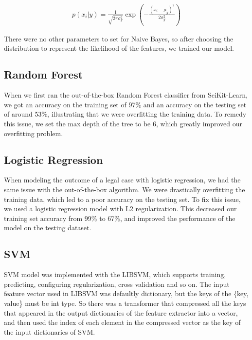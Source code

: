 \documentclass[journal]{IEEEtran}
\begin{document}
\begin{equation}
\begin{aligned}
p(x_i | y) = \frac{1}{\sqrt{2 \pi \sigma_y^2}} \exp \left ( - \frac{(x_i - \mu_y)^2}{2\sigma_y^2}\right)
\end{aligned}
\end{equation}

There were no other parameters to set for Naive Bayes, so after choosing the distribution to represent the likelihood of the features, we trained our model.

\subsection{Random Forest}

When we first ran the out-of-the-box Random Forest classifier from SciKit-Learn, we got an accuracy on the training set of 97\% and an accuracy on the testing set of around 53\%, illustrating that we were overfitting the training data. To remedy this issue, we set the max depth of the tree to be 6, which greatly improved our overfitting problem. 

\subsection{Logistic Regression}

When modeling the outcome of a legal case with logistic regression, we had the same issue with the out-of-the-box algorithm. We were drastically overfitting the training data, which led to a poor accuracy on the testing set. To fix this issue, we used a logistic regression model with L2 regularization. This decreased our training set accuracy from 99\% to 67\%, and improved the performance of the model on the testing dataset. 

\subsection{SVM}

SVM model was implemented with the LIBSVM, which supports training, predicting, configuring regularization, cross validation and so on. The input feature vector used in LIBSVM was defaultly dictionary, but the keys of the \{key, value\} must be int type.
So there was a transformer that compressed all the keys that appeared in the output dictionaries of the feature extractor into a vector, and then used the index of each element in the compressed vector as the key of the input dictionaries of SVM. 
\end{document}
